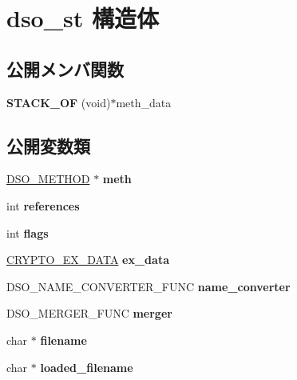 \hypertarget{structdso__st}{}\section{dso\+\_\+st 構造体}
\label{structdso__st}
\subsection*{公開メンバ関数}
\begin{DoxyCompactItemize}
\item 
\hypertarget{structdso__st_acb41348359d00e800f41f1937847f2f6}{}{\bfseries S\+T\+A\+C\+K\+\_\+\+O\+F} (void)$\ast$meth\+\_\+data\label{structdso__st_acb41348359d00e800f41f1937847f2f6}

\end{DoxyCompactItemize}
\subsection*{公開変数類}
\begin{DoxyCompactItemize}
\item 
\hypertarget{structdso__st_a8a987f21e7657122da916308d8bf430f}{}\hyperlink{structdso__meth__st}{D\+S\+O\+\_\+\+M\+E\+T\+H\+O\+D} $\ast$ {\bfseries meth}\label{structdso__st_a8a987f21e7657122da916308d8bf430f}

\item 
\hypertarget{structdso__st_a6db2623dcc06fe53f8ae4f0487c4fbf5}{}int {\bfseries references}\label{structdso__st_a6db2623dcc06fe53f8ae4f0487c4fbf5}

\item 
\hypertarget{structdso__st_a474a4c01444751dbf14d9ac94729e9b0}{}int {\bfseries flags}\label{structdso__st_a474a4c01444751dbf14d9ac94729e9b0}

\item 
\hypertarget{structdso__st_a77898a2a84603a2bca699d2d6dcf9b8f}{}\hyperlink{structcrypto__ex__data__st}{C\+R\+Y\+P\+T\+O\+\_\+\+E\+X\+\_\+\+D\+A\+T\+A} {\bfseries ex\+\_\+data}\label{structdso__st_a77898a2a84603a2bca699d2d6dcf9b8f}

\item 
\hypertarget{structdso__st_ac326d621386b5835c2686269eab8c96b}{}D\+S\+O\+\_\+\+N\+A\+M\+E\+\_\+\+C\+O\+N\+V\+E\+R\+T\+E\+R\+\_\+\+F\+U\+N\+C {\bfseries name\+\_\+converter}\label{structdso__st_ac326d621386b5835c2686269eab8c96b}

\item 
\hypertarget{structdso__st_a00298e1ff0f65f22b0ec1229d7e8bac1}{}D\+S\+O\+\_\+\+M\+E\+R\+G\+E\+R\+\_\+\+F\+U\+N\+C {\bfseries merger}\label{structdso__st_a00298e1ff0f65f22b0ec1229d7e8bac1}

\item 
\hypertarget{structdso__st_ae981476b0fae6034675c02776f7303d8}{}char $\ast$ {\bfseries filename}\label{structdso__st_ae981476b0fae6034675c02776f7303d8}

\item 
\hypertarget{structdso__st_a96bd03d5fd52dba938c3ba0e28b74946}{}char $\ast$ {\bfseries loaded\+\_\+filename}\label{structdso__st_a96bd03d5fd52dba938c3ba0e28b74946}

\end{DoxyCompactItemize}


